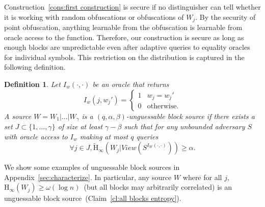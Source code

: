 \documentclass[11pt]{article}
\newcommand{\apref}[1]{\mbox{Appendix~\ref{#1}}}
\newcommand{\clref}[1]{\mbox{Claim~\ref{#1}}}
\newcommand{\consref}[1]{\mbox{Construction~\ref{#1}}}
\newcommand{\Hoo}{\mathrm{H}_\infty}
\newcommand{\Hav}{\tilde{\mathrm{H}}_\infty}
\newtheorem{definition}[theorem]{Definition}
\newcommand{\authnote}[2]{{\textcolor{red}{\textsf{#1 notes: }\textcolor{blue}{ #2}}\marginpar{\textcolor{red}{\textbf{!!!!!}}}}}
\newcommand{\authnote}[2]{}
\newcommand{\bnote}[1]{{\authnote{Ben}{#1}}}
\begin{document}

\consref{cons:first construction} is secure if no distinguisher can tell whether it is working with random obfuscations or obfuscations of $W_j$.  By the security of point obfuscation, anything learnable from the obfuscation is learnable from oracle access to the function. Therefore, our construction is secure as long as enough blocks are unpredictable even after adaptive queries to equality oracles for individual symbols. This restriction on the distribution is captured in the following definition.

\begin{definition}
\label{def:block guessable}
Let $I_w (\cdot, \cdot)$ be an oracle that returns \[I_w(j, w_j')=
\begin{cases}
1 & w_j = w_j'\\
0 & \text{otherwise}.
\end{cases}
\]
A source $W = W_1| ... |W_\gamma$ is a $(q, \alpha, \beta)$-\emph{unguessable block source} if there exists a set $J\subset\{1,..., \gamma\}$ of size at least $\gamma -\beta$ such that for any unbounded adversary $S$ with oracle access to $I_w$ making at most $q$ queries
\[
\forall j\in J, \Hav(W_j |View(S^{I_{W}(\cdot, \cdot)}))\geq \alpha.
\]
\end{definition}

We show some examples of unguessable block sources in \apref{sec:characterize}.  In particular, any source $W$ where for all $j$, $\Hoo(W_j) \geq \omega(\log n)$~(but all blocks may arbitrarily correlated) is an unguessable block source~(\clref{cl:all blocks entropy}).
\end{document}
